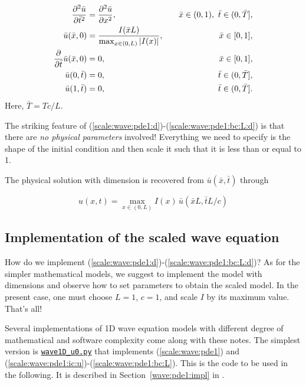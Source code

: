 \documentclass[graybox,envcountchap,sectrefs,final]{svmonodo}
\begin{document}
\begin{align}
\frac{\partial^2 \bar u}{\partial \bar t^2} &=
{\partial^2 \bar u\over\partial x^2}, \quad & \bar x\in (0,1),\ \bar t\in (0,\bar T],
\label{scale:wave:pde1:d}\\ 
\bar u(\bar x,0) &= \frac{I(\bar x L)}{\max_{x\in(0,L)} |I(x)|},
\quad &\bar x\in [0,1],
\label{scale:wave:pde1:ic:u:d}\\ 
{\partial\over\partial \bar t}\bar u(\bar x,0) &= 0,
\quad & \bar x\in [0,1],
\label{scale:wave:pde1:ic:ut:d}\\ 
\bar u(0,\bar t) & = 0,
\quad  &\bar t\in (0,\bar T],
\label{scale:wave:pde1:bc:0:d}\\ 
\bar u(1,\bar t) & = 0,
\quad  &\bar t\in (0,\bar T].
\label{scale:wave:pde1:bc:L:d}
\end{align}
Here, $\bar T = Tc/L$.

The striking feature of
(\ref{scale:wave:pde1:d})-(\ref{scale:wave:pde1:bc:L:d})
is that there are \emph{no physical parameters} involved! Everything we need
to specify is the shape of the initial condition and then scale it
such that it is less than or equal to 1.

The physical solution with dimension is recovered from $\bar u(\bar x,\bar t)$
through

\begin{equation}
u(x,t) = \max_{x\in(0,L)}I(x)\,\bar u(\bar x L, \bar t L/c)
\end{equation}

\subsection{Implementation of the scaled wave equation}
\label{sec:scale:wave:impl}

How do we implement (\ref{scale:wave:pde1:d})-(\ref{scale:wave:pde1:bc:L:d})?
As for the simpler mathematical models, we suggest to implement the model
with dimensions and observe how to set parameters to obtain the scaled
model. In the present case, one must choose $L=1$, $c=1$, and scale $I$ by its
maximum value. That's all!

Several implementations of 1D wave equation models with different
degree of mathematical and software complexity come along with these
notes. The simplest
version is \href{{http://tinyurl.com/o8pb3yy/wave1D_u0.py}}{\nolinkurl{wave1D_u0.py}}
that implements (\ref{scale:wave:pde1}) and
(\ref{scale:wave:pde1:ic:u})-(\ref{scale:wave:pde1:bc:L}).
This is the code to be used in the following. It is described
in Section~\ref{wave:pde1:impl} in \cite{Langtangen_Linge_fdm}.
\end{document}
